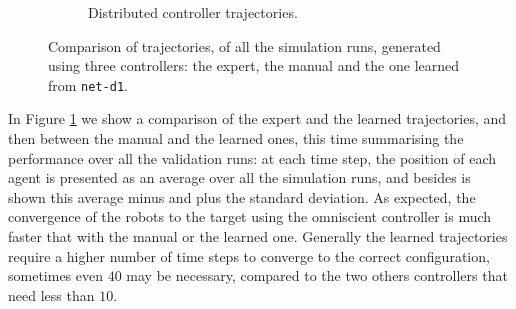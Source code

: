 \begin{figure}[!htb]
\begin{center}
\begin{subfigure}[h]{0.49\textwidth}
			\caption{Distributed controller trajectories.}
		\end{subfigure}
	\end{center}
	\caption[Evaluation of the trajectories learned by \texttt{net-d1}]{Comparison 
	of trajectories, of all the simulation runs, generated 
	using three controllers: the expert, the manual and 
		the one learned from \texttt{net-d1}.}
	\label{fig:net-d1traj}
\end{figure}
In Figure \ref{fig:net-d1traj} we show a comparison of the expert and the learned 
trajectories, and then between the manual and the learned ones, this time 
summarising the performance over all the validation runs: at each time step, the 
position of each agent is presented as an average over all the simulation runs, and 
besides is shown this average minus and plus the standard deviation.
As expected, the convergence of the robots to the target using the omniscient 
controller is much faster that with the manual or the learned one. Generally the 
learned trajectories require a higher number of time steps to converge to the 
correct configuration, sometimes even $40$ may be necessary, compared to the 
two others controllers that need less than $10$.

